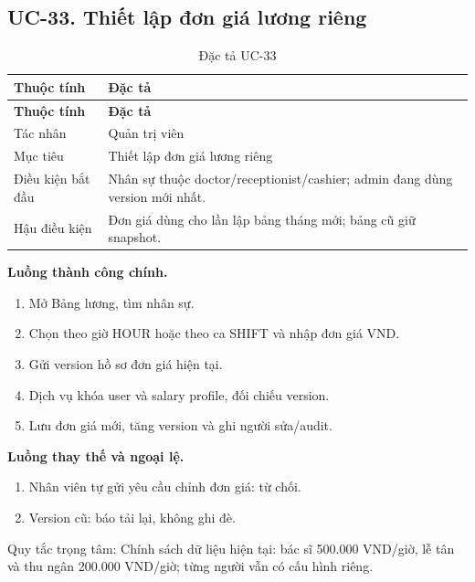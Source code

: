 \clearpage

\subsection{UC-33.\allowbreak{} Thiết lập đơn giá lương riêng}
\label{uc:33}

{\small\setlength{\tabcolsep}{3pt}\renewcommand{\arraystretch}{1.12}
\begin{longtable}{@{}L{\textwidth-1.32pt\relax} L{\textwidth-4.68pt\relax}@{}}
\caption{Đặc tả UC-33}\\
\toprule
\textbf{Thuộc tính} & \textbf{Đặc tả}\\\midrule
\endfirsthead
\toprule
\textbf{Thuộc tính} & \textbf{Đặc tả}\\\midrule
\endhead
\bottomrule\endlastfoot
Tác nhân & Quản trị viên\\[3pt]
Mục tiêu & Thiết lập đơn giá lương riêng\\[3pt]
Điều kiện bắt đầu & Nhân sự thuộc doctor/\allowbreak{}receptionist/\allowbreak{}cashier; admin đang dùng version mới nhất.\allowbreak{}\\[3pt]
Hậu điều kiện & Đơn giá dùng cho lần lập bảng tháng mới; bảng cũ giữ snapshot.\allowbreak{}\\[3pt]
\end{longtable}}
\noindent\textbf{Luồng thành công chính.}
\begin{enumerate}
\item Mở Bảng lương, tìm nhân sự.\allowbreak{}
\item Chọn theo giờ HOUR hoặc theo ca SHIFT và nhập đơn giá VND.\allowbreak{}
\item Gửi version hồ sơ đơn giá hiện tại.\allowbreak{}
\item Dịch vụ khóa user và salary profile, đối chiếu version.\allowbreak{}
\item Lưu đơn giá mới, tăng version và ghi người sửa/\allowbreak{}audit.\allowbreak{}
\end{enumerate}
\noindent\textbf{Luồng thay thế và ngoại lệ.}
\begin{enumerate}
\item Nhân viên tự gửi yêu cầu chỉnh đơn giá:\allowbreak{} từ chối.\allowbreak{}
\item Version cũ:\allowbreak{} báo tải lại, không ghi đè.\allowbreak{}
\end{enumerate}
Quy tắc trọng tâm:\allowbreak{} Chính sách dữ liệu hiện tại:\allowbreak{} bác sĩ 500.\allowbreak{}000 VND/\allowbreak{}giờ, lễ tân và thu ngân 200.\allowbreak{}000 VND/\allowbreak{}giờ; từng người vẫn có cấu hình riêng.\allowbreak{}

